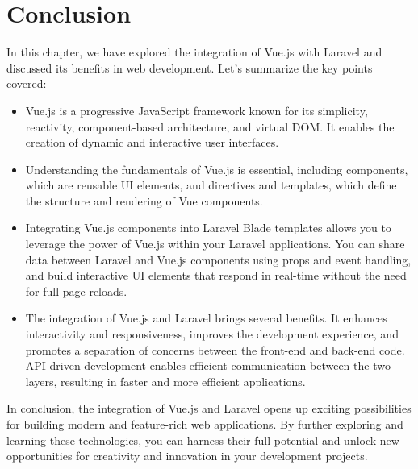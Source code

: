 \newpage
\section{Conclusion}
In this chapter, we have explored the integration of Vue.js with Laravel and discussed its benefits in web development. Let's summarize the key points covered:
\begin{itemize}
    \item Vue.js is a progressive JavaScript framework known for its simplicity, reactivity, component-based architecture, and virtual DOM. It enables the creation of dynamic and interactive user interfaces.
    
    \item Understanding the fundamentals of Vue.js is essential, including components, which are reusable UI elements, and directives and templates, which define the structure and rendering of Vue components.

    \item Integrating Vue.js components into Laravel Blade templates allows you to leverage the power of Vue.js within your Laravel applications. You can share data between Laravel and Vue.js components using props and event handling, and build interactive UI elements that respond in real-time without the need for full-page reloads.

    \item The integration of Vue.js and Laravel brings several benefits. It enhances interactivity and responsiveness, improves the development experience, and promotes a separation of concerns between the front-end and back-end code. API-driven development enables efficient communication between the two layers, resulting in faster and more efficient applications.
\end{itemize}
In conclusion, the integration of Vue.js and Laravel opens up exciting possibilities for building modern and feature-rich web applications. By further exploring and learning these technologies, you can harness their full potential and unlock new opportunities for creativity and innovation in your development projects.
